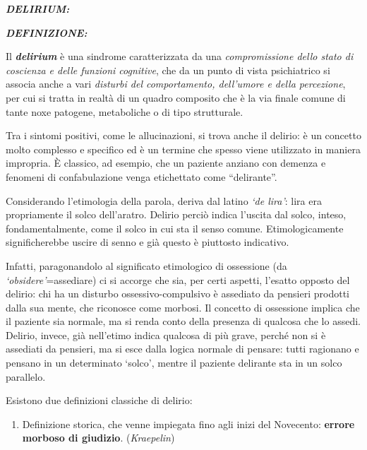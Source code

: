 \documentclass[]{article}
\date{}
\begin{document}
\textbf{\emph{DELIRIUM:}}

\textbf{\emph{DEFINIZIONE:}}

Il \textbf{\emph{delirium}} è una sindrome caratterizzata da una
\emph{compromissione dello stato di coscienza e delle funzioni
cognitive}, che da un punto di vista psichiatrico si associa anche a
vari \emph{disturbi del comportamento, dell'umore e della percezione},
per cui si tratta in realtà di un quadro composito che è la via finale
comune di tante noxe patogene, metaboliche o di tipo strutturale.

Tra i sintomi positivi, come le allucinazioni, si trova anche il
delirio: è un concetto molto complesso e specifico ed è un termine che
spesso viene utilizzato in maniera impropria. È classico, ad esempio,
che un paziente anziano con demenza e fenomeni di confabulazione venga
etichettato come ``delirante''.

Considerando l'etimologia della parola, deriva dal latino \emph{`de
lira'}: lira era propriamente il solco dell'aratro. Delirio perciò
indica l'uscita dal solco, inteso, fondamentalmente, come il solco in
cui sta il senso comune. Etimologicamente significherebbe uscire di
senno e già questo è piuttosto indicativo.

Infatti, paragonandolo al significato etimologico di ossessione (da
\emph{`obsidere'}=assediare) ci si accorge che sia, per certi aspetti,
l'esatto opposto del delirio: chi ha un disturbo ossessivo-compulsivo è
assediato da pensieri prodotti dalla sua mente, che riconosce come
morbosi. Il concetto di ossessione implica che il paziente sia normale,
ma si renda conto della presenza di qualcosa che lo assedi. Delirio,
invece, già nell'etimo indica qualcosa di più grave, perché non si è
assediati da pensieri, ma si esce dalla logica normale di pensare: tutti
ragionano e pensano in un determinato `solco', mentre il paziente
delirante sta in un solco parallelo.

Esistono due definizioni classiche di delirio:

\begin{enumerate}
\def\labelenumi{\arabic{enumi}.}
\item
  Definizione storica, che venne impiegata fino agli inizi del
  Novecento: \textbf{errore morboso di giudizio}. (\emph{Kraepelin})
\end{enumerate}
\end{document}
